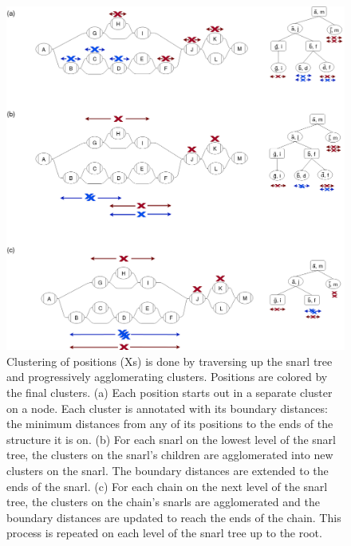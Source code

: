 \documentclass[11pt]{ucscthesis}
\begin{document}
\begin{figure}[H]
\centering
\includegraphics[width=\columnwidth]{aim1_cluster_example.png}
\caption[Clustering algorithm]{
Clustering of positions (Xs) is done by traversing up the snarl tree and progressively agglomerating clusters. Positions are colored by the final clusters.
(a) Each position starts out in a separate cluster on a node. Each cluster is annotated with its boundary distances: the minimum distances from any of its positions to the ends of the structure it is on.
(b) For each snarl on the lowest level of the snarl tree, the clusters on the snarl's children are agglomerated into new clusters on the snarl. The boundary distances are extended to the ends of the snarl.
(c) For each chain on the next level of the snarl tree, the clusters on the chain's snarls are agglomerated and the boundary distances are updated to reach the ends of the chain.
This process is repeated on each level of the snarl tree up to the root.}
  \label{fig:aim1_cluster_example}
\end{figure}
\end{document}
